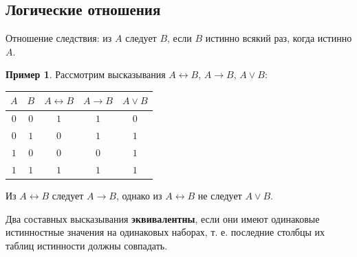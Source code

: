 \documentclass[a5paper, 11pt]{extarticle}
\theoremstyle{definition}
\newtheorem*{example*}{Пример}
\theoremstyle{definition}
\theoremstyle{definition}
\numberwithin{figure}{section}
\numberwithin{table}{section}
\begin{document}
\subsection{Логические отношения}

Отношение следствия: из \(A\) следует \(B\), если \(B\) истинно всякий раз, когда истинно \(A\).

\begin{example*}
    Рассмотрим высказывания \(A \leftrightarrow B\), \(A \to B\), \(A \lor B\):
    {
    \renewcommand*{\arraystretch}{1.5}
    \begin{longtable}{|c|c|c|c|c|}
        \hline
        \(A\) & \(B\) & \(A \leftrightarrow B\) & \(A \to B\) & \(A \lor B\) \\
        \hline
        \(0\) & \(0\) & \(1\)                   & \(1\)       & \(0\)        \\
        \hline
        \(0\) & \(1\) & \(0\)                   & \(1\)       & \(1\)        \\
        \hline
        \(1\) & \(0\) & \(0\)                   & \(0\)       & \(1\)        \\
        \hline
        \(1\) & \(1\) & \(1\)                   & \(1\)       & \(1\)        \\
        \hline
    \end{longtable}
    }
    Из \(A \leftrightarrow B\) следует \(A \to B\), однако из \(A \leftrightarrow B\) не следует \(A \lor B\).
\end{example*}

Два составных высказывания \textbf{эквивалентны}, если они имеют одинаковые истинностные значения на одинаковых наборах, т. е. последние столбцы их таблиц истинности должны совпадать.
\end{document}
